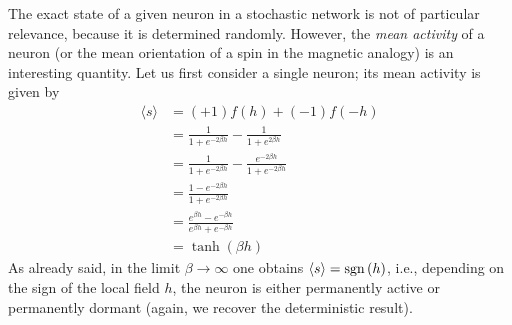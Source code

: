 The exact state of a given neuron in a stochastic network is not of particular relevance, because it is determined randomly. However, the \emph{mean activity} of a neuron (or the mean orientation of a spin in the magnetic analogy) is an interesting quantity. Let us first consider a single neuron; its mean activity is given by
\begin{equation}
\begin{split}
\langle s\rangle&=(+1)f(h)+(-1)f(-h)\\
&=\frac{1}{1+e^{-2\beta h}}-\frac{1}{1+e^{2\beta h}}\\
&=\frac{1}{1+e^{-2\beta h}}-\frac{e^{-2\beta h}}{1+e^{-2\beta h}}\\
&=\frac{1-e^{-2\beta h}}{1+e^{-2\beta h}}\\
&=\frac{e^{\beta h}-e^{-\beta h}}{e^{\beta h}+e^{-\beta h}}\\
&=\tanh{(\beta h)}
\end{split}
\end{equation}
As already said, in the limit $\beta\rightarrow\infty$ one obtains $\langle s\rangle=\operatorname{sgn}{(h)}$, i.e., depending on the sign of the local field $h$, the neuron is either permanently active or permanently dormant (again, we recover the deterministic result).
